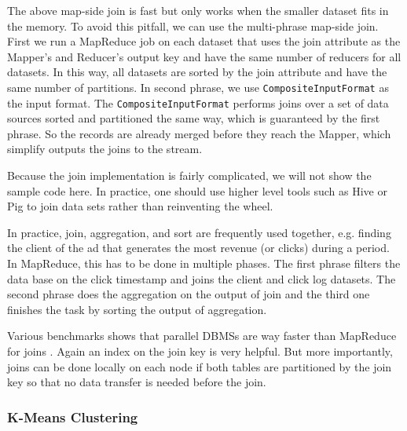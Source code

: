 \documentclass[11pt]{book}
\begin{document}
The above map-side join is fast but only works when the smaller dataset fits in the memory. To avoid this pitfall, we can use the multi-phrase map-side join. First we run a MapReduce job on each dataset that uses the join attribute as the Mapper's and Reducer's output key and have the same number of reducers for all datasets. In this way, all datasets are sorted by the join attribute and have the same number of partitions. In second phrase, we use \texttt{CompositeInputFormat} as the input format. The \texttt{CompositeInputFormat} performs joins over a set of data sources sorted and partitioned the same way, which is guaranteed by the first phrase. So the records are already merged before they reach the Mapper, which simplify outputs the joins to the stream.

Because the join implementation is fairly complicated, we will not show the sample code here. In practice, one should use higher level tools such as Hive or Pig to join data sets rather than reinventing the wheel.

In practice, join, aggregation, and sort are frequently used together, e.g. finding the client of the ad that generates the most revenue (or clicks) during a period. In MapReduce, this has to be done in multiple phases. The first phrase filters the data base on the click timestamp and joins the client and click log datasets. The second phrase does the aggregation on the output of join and the third one finishes the task by sorting the output of aggregation. 

Various benchmarks shows that parallel DBMSs are way faster than MapReduce for joins \cite{Pavlo:2009:CAL}. Again an index on the join key is very helpful. But more importantly, joins can be done locally on each node if both tables are partitioned by the join key so that no data transfer is needed before the join.

\subsubsection{K-Means Clustering}
\end{document}
